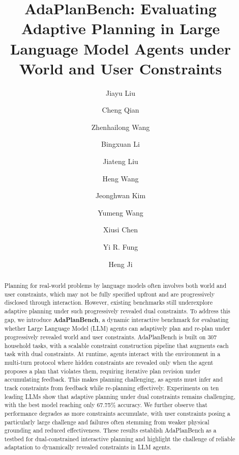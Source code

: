 \documentclass{llmxive}
\title{AdaPlanBench: Evaluating Adaptive Planning in Large Language Model Agents under World and User Constraints}
\author{Jiayu Liu \and Cheng Qian \and Zhenhailong Wang \and Bingxuan Li \and Jiateng Liu \and Heng Wang \and Jeonghwan Kim \and Yumeng Wang \and Xiusi Chen \and Yi R. Fung \and Heng Ji}
\providecommand{\BENCH}[1]{\textbf{AdaPlanBench}}
\providecommand{\bench}[1]{AdaPlanBench}
\begin{document}
\maketitle
\begin{abstract}
Planning for real-world problems by language models often involves both world and user constraints, which may not be fully specified upfront and are progressively disclosed through interaction. 
However, existing benchmarks still underexplore adaptive planning under such progressively revealed dual constraints.
To address this gap, we introduce \BENCH{}, a dynamic interactive benchmark for evaluating whether Large Language Model (LLM) agents can adaptively plan and re-plan under progressively revealed world and user constraints.
\bench{} is built on 307 household tasks, with a scalable constraint construction pipeline that augments each task with dual constraints.
At runtime, agents interact with the environment in a multi-turn protocol where hidden constraints are revealed only when the agent proposes a plan that violates them, requiring iterative plan revision under accumulating feedback. 
This makes planning challenging, as agents must infer and track constraints from feedback while re-planning effectively.
Experiments on ten leading LLMs show that adaptive planning under dual constraints remains challenging, with the best model reaching only 67.75\% accuracy.
We further observe that performance degrades as more constraints accumulate, with user constraints posing a particularly large challenge and failures often stemming from weaker physical grounding and reduced effectiveness.
These results establish \bench{} as a testbed for dual-constrained interactive planning and highlight the challenge of reliable adaptation to dynamically revealed constraints in LLM agents. 
\end{abstract}
\ifcolmsubmission
\linenumbers
\fi
\end{document}
